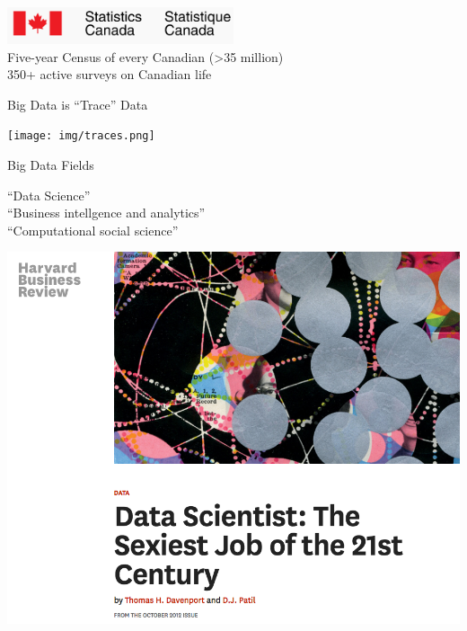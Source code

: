 \documentclass{beamer}
\begin{document}
\begin{frame}[plain]
  \begin{center}
      \includegraphics[width=0.5\textwidth]{img/stats-can.png} \\
      Five-year Census of every Canadian (>35 million) \\
      350+ active surveys on Canadian life
  \end{center}
\end{frame}

\begin{frame}{Big Data is ``Trace'' Data}
  \begin{center}
    \texttt{[image: img/traces.png]} 
  \end{center}
\end{frame}

\begin{frame}{Big Data Fields}
    \begin{center}
        ``Data Science'' \\
        ``Business intellgence and analytics'' \\
        ``Computational social science''
    \end{center}
\end{frame}

\begin{frame}[plain]
  \includegraphics[width=\paperwidth]{img/data-science-hbr-sexy.png}
\end{frame}
\end{document}
